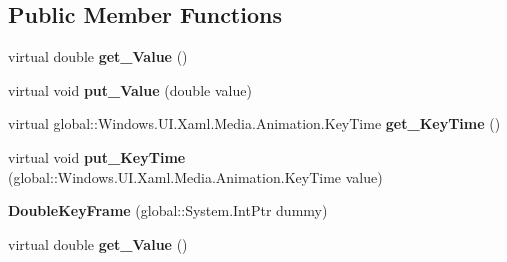 \subsection*{Public Member Functions}
\begin{DoxyCompactItemize}
\item 
\mbox{\label{class_windows_1_1_u_i_1_1_xaml_1_1_media_1_1_animation_1_1_double_key_frame_adc110c3fd704a81e10de729dc7620cbe}} 
virtual double {\bfseries get\+\_\+\+Value} ()
\item 
\mbox{\label{class_windows_1_1_u_i_1_1_xaml_1_1_media_1_1_animation_1_1_double_key_frame_ac8e9c608ef950cb4d594ab20df238c67}} 
virtual void {\bfseries put\+\_\+\+Value} (double value)
\item 
\mbox{\label{class_windows_1_1_u_i_1_1_xaml_1_1_media_1_1_animation_1_1_double_key_frame_aaa90bbff5cfbe24151ea9aa41a84bdc3}} 
virtual global\+::\+Windows.\+U\+I.\+Xaml.\+Media.\+Animation.\+Key\+Time {\bfseries get\+\_\+\+Key\+Time} ()
\item 
\mbox{\label{class_windows_1_1_u_i_1_1_xaml_1_1_media_1_1_animation_1_1_double_key_frame_a24618f65820c8ef09899ef7a3e13156f}} 
virtual void {\bfseries put\+\_\+\+Key\+Time} (global\+::\+Windows.\+U\+I.\+Xaml.\+Media.\+Animation.\+Key\+Time value)
\item 
\mbox{\label{class_windows_1_1_u_i_1_1_xaml_1_1_media_1_1_animation_1_1_double_key_frame_a901b2c0f622bb7b0e3f8f1c92ef2e678}} 
{\bfseries Double\+Key\+Frame} (global\+::\+System.\+Int\+Ptr dummy)
\item 
\mbox{\label{class_windows_1_1_u_i_1_1_xaml_1_1_media_1_1_animation_1_1_double_key_frame_adc110c3fd704a81e10de729dc7620cbe}} 
virtual double {\bfseries get\+\_\+\+Value} ()
\item 
\mbox{\label{class_windows_1_1_u_i_1_1_xaml_1_1_media_1_1_animation_1_1_double_key_frame_ac8e9c608ef950cb4d594ab20df238c67}} 

\end{DoxyCompactItemize}
